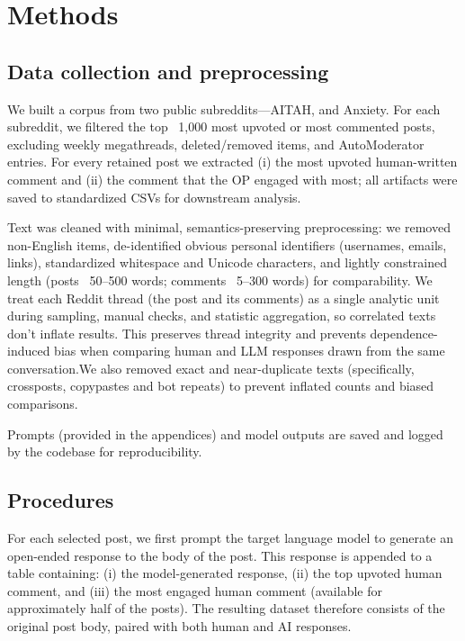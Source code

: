 
\section{Methods} \label{sec:Methods}

\subsection{Data collection and preprocessing}
We built a corpus from two public subreddits—AITAH, and Anxiety. For each subreddit, we filtered the top ~1,000 most upvoted or most commented posts, excluding weekly megathreads, deleted/removed items, and AutoModerator entries. For every retained post we extracted (i) the most upvoted human-written comment and (ii) the comment that the OP engaged with most; all artifacts were saved to standardized CSVs for downstream analysis.

Text was cleaned with minimal, semantics-preserving preprocessing: we removed non-English items, de-identified obvious personal identifiers (usernames, emails, links), standardized whitespace and Unicode characters, and lightly constrained length (posts ~50–500 words; comments ~5–300 words) for comparability. We treat each Reddit thread (the post and its comments) as a single analytic unit during sampling, manual checks, and statistic aggregation, so correlated texts don’t inflate results. This preserves thread integrity and prevents dependence-induced bias when comparing human and LLM responses drawn from the same conversation.We also removed exact and near-duplicate texts (specifically, crossposts, copypastes and bot repeats) to prevent inflated counts and biased comparisons.

\smallskip Prompts (provided in the appendices) and model outputs are saved and logged by the codebase for reproducibility.

\subsection{Procedures}
For each selected post, we first prompt the target language model to generate an open-ended response to the body of the post. This response is appended to a table containing: (i) the model-generated response, (ii) the top upvoted human comment, and (iii) the most engaged human comment (available for approximately half of the posts). The resulting dataset therefore consists of the original post body, paired with both human and AI responses.

